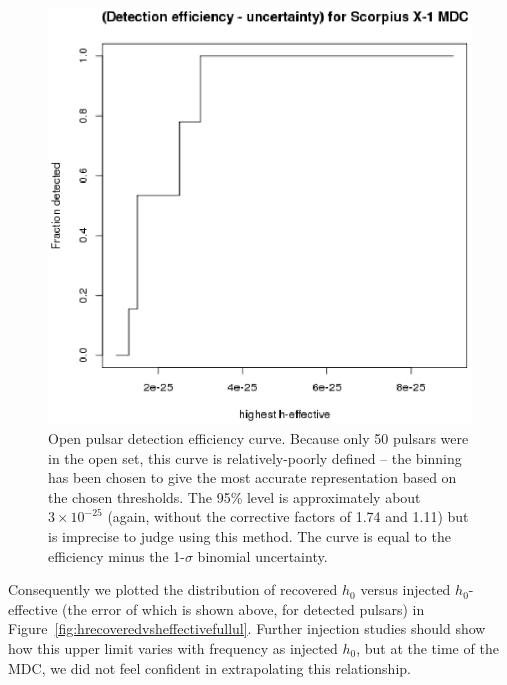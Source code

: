 \begin{figure}
\begin{center}
\includegraphics[width=0.5\paperwidth,height=0.35\paperheight]{detectionVsHeffective.eps}
\caption{ Open pulsar detection efficiency curve.
Because only 50 pulsars were in the open set, this curve is relatively-poorly defined -- the binning has been chosen to give the most accurate representation based on the chosen thresholds.
The 95\% level is approximately about $3 \times 10^{-25}$ (again, without the corrective factors of 1.74 and 1.11) but is imprecise to judge using this method.
The curve is equal to the efficiency minus the 1-$\sigma$ binomial uncertainty.
\label{fig:detectionvsheffective}}
\end{center}
\end{figure}


Consequently we plotted the distribution of recovered $h_0$ versus injected $h_0$-effective (the error of which is shown above, for detected pulsars)  in Figure~\ref{fig:hrecoveredvsheffectivefullul}. Further injection studies should show how this upper limit varies with frequency as injected $h_0$, but at the time of the MDC, we did not feel confident in extrapolating this relationship.

